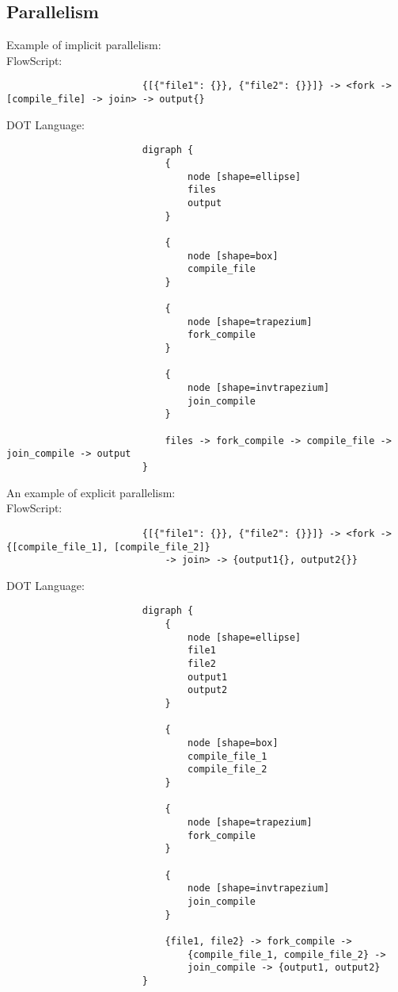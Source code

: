 \documentclass{article}
\begin{document}
			\subsection{Parallelism}
				Example of implicit parallelism: \\
					FlowScript:
					\begin{verbatim}
						{[{"file1": {}}, {"file2": {}}]} -> <fork -> [compile_file] -> join> -> output{}
					\end{verbatim}
					DOT Language:
					\begin{verbatim}
						digraph {
						    {
						        node [shape=ellipse]
						        files
						        output
						    }

						    {
						        node [shape=box]
						        compile_file
						    }
    
						    {
						        node [shape=trapezium]
						        fork_compile
						    }

						    {
						        node [shape=invtrapezium]
						        join_compile
						    }

						    files -> fork_compile -> compile_file -> join_compile -> output
						}
					\end{verbatim}
				An example of explicit parallelism: \\
					FlowScript:
					\begin{verbatim}
						{[{"file1": {}}, {"file2": {}}]} -> <fork -> {[compile_file_1], [compile_file_2]} 
							-> join> -> {output1{}, output2{}}
					\end{verbatim}
					DOT Language:
					\begin{verbatim}
						digraph {
						    {
						        node [shape=ellipse]
						        file1
						        file2
						        output1
						        output2
						    }

						    {
						        node [shape=box]
						        compile_file_1
						        compile_file_2
						    }
    
						    {
						        node [shape=trapezium]
						        fork_compile
						    }

						    {
						        node [shape=invtrapezium]
						        join_compile
						    }

						    {file1, file2} -> fork_compile ->
								{compile_file_1, compile_file_2} ->
								join_compile -> {output1, output2}
						}
					\end{verbatim}
\end{document}
